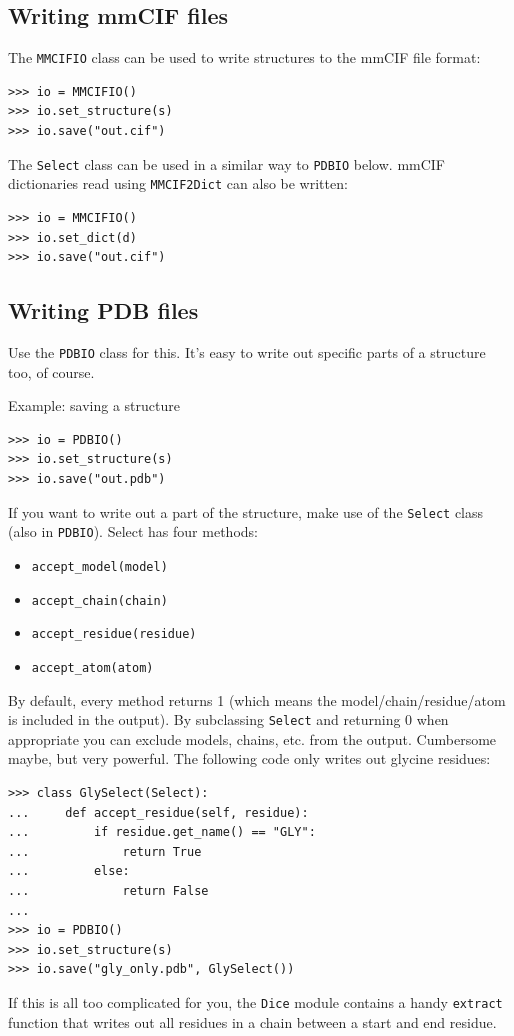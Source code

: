 \subsection{Writing mmCIF files}

The \texttt{MMCIFIO} class can be used to write structures to the mmCIF file format:

\begin{verbatim}
>>> io = MMCIFIO()
>>> io.set_structure(s)
>>> io.save("out.cif")
\end{verbatim}
The \texttt{Select} class can be used in a similar way to \texttt{PDBIO} below.
mmCIF dictionaries read using \texttt{MMCIF2Dict} can also be written:

\begin{verbatim}
>>> io = MMCIFIO()
>>> io.set_dict(d)
>>> io.save("out.cif")
\end{verbatim}

\subsection{Writing PDB files}

Use the \texttt{PDBIO} class for this. It's easy to write out specific parts
of a structure too, of course.

Example: saving a structure

\begin{verbatim}
>>> io = PDBIO()
>>> io.set_structure(s)
>>> io.save("out.pdb")
\end{verbatim}
If you want to write out a part of the structure, make use of the
\texttt{Select} class (also in \texttt{PDBIO}). Select has four methods:

\begin{itemize}
\item \verb+accept_model(model)+
\item \verb+accept_chain(chain)+
\item \verb+accept_residue(residue)+
\item \verb+accept_atom(atom)+
\end{itemize}
By default, every method returns 1 (which means the model/\-chain/\-residue/\-atom
is included in the output). By subclassing \texttt{Select} and returning
0 when appropriate you can exclude models, chains, etc. from the output.
Cumbersome maybe, but very powerful. The following code only writes
out glycine residues:

\begin{verbatim}
>>> class GlySelect(Select):
...     def accept_residue(self, residue):
...         if residue.get_name() == "GLY":
...             return True
...         else:
...             return False
...
>>> io = PDBIO()
>>> io.set_structure(s)
>>> io.save("gly_only.pdb", GlySelect())
\end{verbatim}
If this is all too complicated for you, the \texttt{Dice} module contains
a handy \texttt{extract} function that writes out all residues in
a chain between a start and end residue.

